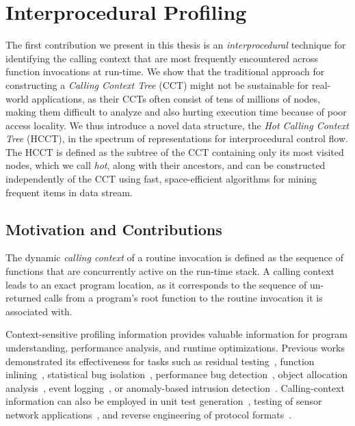\section{Interprocedural Profiling}

The first contribution we present in this thesis is an {\em interprocedural} technique for identifying the calling context that are most frequently encountered across function invocations at run-time. We show that the traditional approach for constructing a {\em Calling Context Tree} (CCT) might not be sustainable for real-world applications, as their CCTs often consist of tens of millions of nodes, making them difficult to analyze and also hurting execution time because of poor access locality. We thus introduce a novel data structure, the {\em Hot Calling Context Tree} (HCCT), in the spectrum of representations for interprocedural control flow. The HCCT is defined as the subtree of the CCT containing only its most visited nodes, which we call {\em hot}, along with their ancestors, and can be constructed independently of the CCT using fast, space-efficient algorithms for mining frequent items in data stream.

\subsection{Motivation and Contributions}
The dynamic {\em calling context} of a routine invocation is defined as the sequence of functions that are concurrently active on the run-time stack. A calling context leads to an exact program location, as it corresponds to the sequence of un-returned calls from a program’s root function to the routine invocation it is associated with.

Context-sensitive profiling information provides valuable information for program understanding, performance analysis, and runtime optimizations. Previous works demonstrated its effectiveness for tasks such as residual testing~\cite{PavlopoulouY99,Vaswani07}, function inlining~\cite{Chang92}, statistical bug isolation~\cite{Feng03,Liblit03}, performance bug detection~\cite{Nistor13}, object allocation analysis~\cite{Nethercote07}, event logging~\cite{Zhang06}, or anomaly-based intrusion detection~\cite{Bond07}.
Calling-context information can also be employed in unit test generation~\cite{Villazon09}, testing of sensor network applications~\cite{Lai08}, and reverse engineering of protocol formats~\cite{Lin08}.

